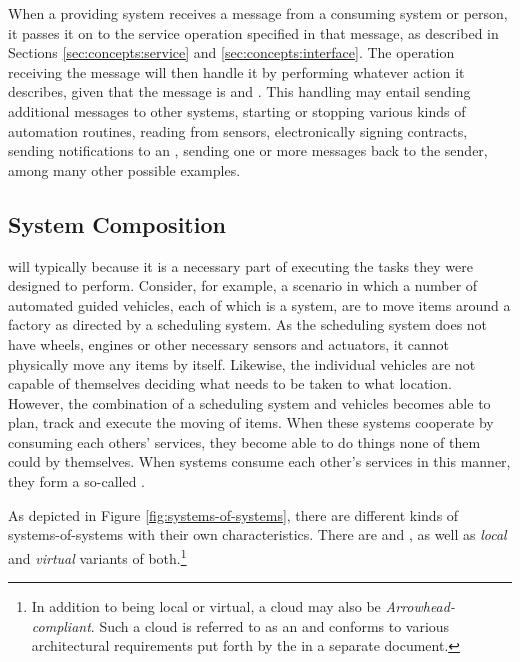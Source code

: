 When a providing system receives a message from a consuming system or person, it passes it on to the service operation specified in that message, as described in Sections \ref{sec:concepts:service} and \ref{sec:concepts:interface}.
The operation receiving the message will then handle it by performing whatever action it describes, given that the message is  and .
This handling may entail sending additional messages to other systems, starting or stopping various kinds of automation routines, reading from sensors, electronically signing contracts, sending notifications to an , sending one or more messages back to the sender, among many other possible examples.

\subsection{System Composition}
\label{sec:overview:system-composition}

 will typically  because it is a necessary part of executing the tasks they were designed to perform.
Consider, for example, a scenario in which a number of automated guided vehicles, each of which is a system, are to move items around a factory as directed by a scheduling system.
As the scheduling system does not have wheels, engines or other necessary sensors and actuators, it cannot physically move any items by itself. 
Likewise, the individual vehicles are not capable of themselves deciding what needs to be taken to what location.
However, the combination of a scheduling system and vehicles becomes able to plan, track and execute the moving of items.
When these systems cooperate by consuming each others' services, they become able to do things none of them could by themselves.
When systems consume each other's services in this manner, they form a so-called .

As depicted in Figure \ref{fig:systems-of-systems}, there are different kinds of systems-of-systems with their own characteristics.
There are  and , as well as \textit{local} and \textit{virtual} variants of both.\footnote{
  In addition to being local or virtual, a cloud may also be \textit{Arrowhead-compliant}.
  Such a cloud is referred to as an  and conforms to various architectural requirements put forth by the  in a separate document.
}

